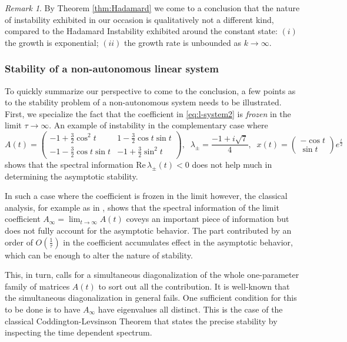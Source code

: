 \documentclass[a4paper,11pt]{article}
\theoremstyle{remark}
\newtheorem{remark}{Remark}[section]
\begin{document}
\begin{remark} By Theorem \ref{thm:Hadamard} we come to a conclusion that the nature of instability exhibited in our occasion is qualitatively not a different kind, compared to the Hadamard Instability exhibited around the constant state: $(i)$ the growth is exponential; $(ii)$ the growth rate is unbounded as $k \rightarrow \infty$.
\end{remark}

\subsubsection{Stability of a non-autonomous linear system}
To quickly summarize our perspective to come to the conclusion, a few points as to the stability problem of a non-autonomous system needs to be illustrated. First, we specialize the fact that the coefficient in \eqref{eq:l-system2} is {\it frozen} in the limit $\tau \rightarrow \infty$. An example of instability in the complementary case where
$$
A(t) = \left(\begin{array}{cc} -1 + \frac{3}{2}\cos^2 t & 1-\frac{3}{2}\cos t \sin t \\ -1 -\frac{3}{2}\cos t \sin t & -1 + \frac{3}{2}\sin^2 t \end{array}\right), \;\; \lambda_\pm = \frac{-1 + i\sqrt{7}}{4},
\; \; x(t) = \left(\begin{array}{c} -\cos t\\ \sin t \end{array}\right) e^{\tfrac{t}{2}}$$
shows that the spectral information  $\textrm{Re}\, \lambda_\pm(t)<0$ does not help much in determining the asymptotic stability.

In such a case where the coefficient is frozen in the limit however, the classical analysis, for example as in \cite{CL55}, shows that the spectral information of the limit coefficient $\displaystyle A_\infty=\lim_{t \rightarrow\infty} A(t)$ coveys an important piece of information but does not fully account for the asymptotic behavior. The part contributed by an order of $O(\tfrac{1}{\tau})$ in the coefficient accumulates effect in the asymptotic behavior, which can be enough to alter the nature of stability.

This, in turn, calls for a simultaneous diagonalization of the whole one-parameter family of matrices $A(t)$ to sort out all the contribution. It is well-known that the simultaneous diagonalization in general fails. One sufficient condition for this to be done is to have $A_\infty$ have eigenvalues all distinct. This is the case of the classical Coddington-Levsinson Theorem \cite{CL55} that states the precise stability by inspecting the time dependent spectrum.
\end{document}
